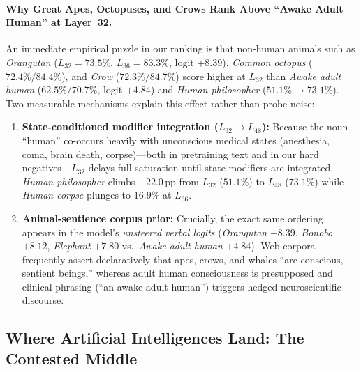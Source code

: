 \documentclass[10pt,twocolumn]{article}
\begin{document}
\paragraph{Why Great Apes, Octopuses, and Crows Rank Above ``Awake Adult Human'' at Layer~32.}
An immediate empirical puzzle in our ranking is that non-human animals such as \emph{Orangutan} ($L_{32}=73.5\%$, $L_{36}=83.3\%$, logit $+8.39$), \emph{Common octopus} ($72.4\% / 84.4\%$), and \emph{Crow} ($72.3\% / 84.7\%$) score higher at $L_{32}$ than \emph{Awake adult human} ($62.5\% / 70.7\%$, logit $+4.84$) and \emph{Human philosopher} ($51.1\% \rightarrow 73.1\%$). Two measurable mechanisms explain this effect rather than probe noise:
\begin{enumerate}
  \item \textbf{State-conditioned modifier integration ($L_{32} \rightarrow L_{48}$):} Because the noun ``human'' co-occurs heavily with unconscious medical states (anesthesia, coma, brain death, corpse)---both in pretraining text and in our hard negatives---$L_{32}$ delays full saturation until state modifiers are integrated. \emph{Human philosopher} climbs $+22.0$\,pp from $L_{32}$ ($51.1\%$) to $L_{48}$ ($73.1\%$) while \emph{Human corpse} plunges to $16.9\%$ at $L_{36}$.
  \item \textbf{Animal-sentience corpus prior:} Crucially, the exact same ordering appears in the model's \emph{unsteered verbal logits} (\emph{Orangutan} $+8.39$, \emph{Bonobo} $+8.12$, \emph{Elephant} $+7.80$ vs.\ \emph{Awake adult human} $+4.84$). Web corpora frequently assert declaratively that apes, crows, and whales ``are conscious, sentient beings,'' whereas adult human consciousness is presupposed and clinical phrasing (``an awake adult human'') triggers hedged neuroscientific discourse.
\end{enumerate}

\subsection{Where Artificial Intelligences Land: The Contested Middle}
\end{document}
